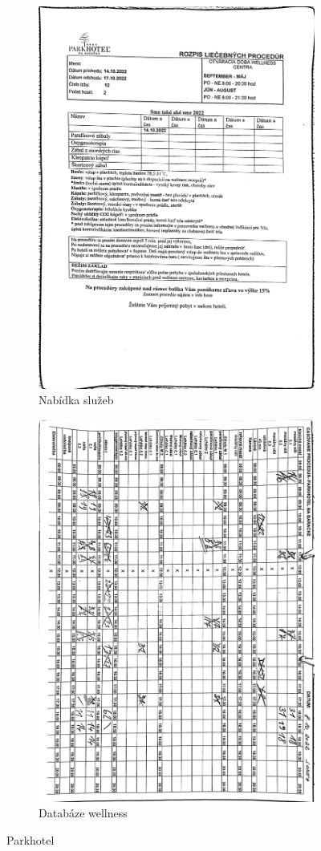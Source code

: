 \begin{figure}[h]
    \begin{subfigure}{.5\textwidth}
        \centering
        \includegraphics[width=.4\linewidth]{doc/latex/fig/vlado/IMG_9344.jpg}
        \caption{Nabídka služeb}
        \label{fig:parkhotel_wellnes_services}
    \end{subfigure}
    \begin{subfigure}{.5\textwidth}
        \centering
        \includegraphics[width=.4\linewidth]{doc/latex/fig/vlado/IMG_9343.jpg}
        \caption{Databáze wellness}
        \label{fig:parkhotel_wellnes_database}
    \end{subfigure}
    \caption{Parkhotel}
    \label{fig:parkhotel}
\end{figure}

